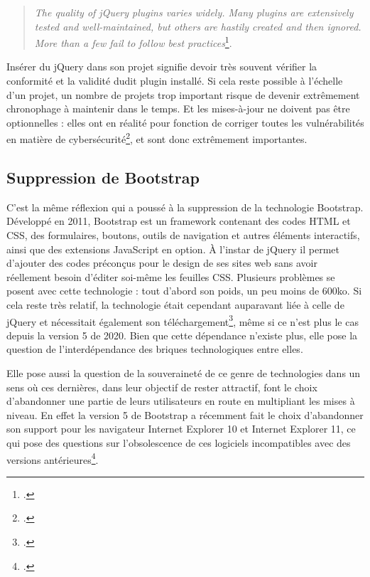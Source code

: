 \documentclass[a4paper,12pt,twoside]{book}
\begin{document}
\begin{otherlanguage}{english}
\begin{quote}
    \textit{The quality of jQuery plugins varies widely. Many plugins are extensively tested and well-maintained, but others are hastily created and then ignored. More than a few fail to follow best practices}\footcite{jquery}.
\end{quote}
\end{otherlanguage}

Insérer du jQuery dans son projet signifie devoir très souvent vérifier la conformité et la validité dudit plugin installé. Si cela reste possible à l'échelle d'un projet, un nombre de projets trop important risque de devenir extrêmement chronophage à maintenir dans le temps. Et les mises-à-jour ne doivent pas être optionnelles : elles ont en réalité pour fonction de corriger toutes les vulnérabilités en matière de cybersécurité\footcite{security}, et sont donc extrêmement importantes.

\subsection{Suppression de Bootstrap}
C'est la même réflexion qui a poussé à la suppression de la technologie Bootstrap. Développé en 2011, Bootstrap est un framework contenant des codes \acrshort{HTML} et CSS, des formulaires, boutons, outils de navigation et autres éléments interactifs, ainsi que des extensions JavaScript en option. À l'instar de jQuery il permet d'ajouter des codes préconçus pour le design de ses sites web sans avoir réellement besoin d'éditer soi-même les feuilles CSS. Plusieurs problèmes se posent avec cette technologie : tout d'abord son poids, un peu moins de 600ko. Si cela reste très relatif, la technologie était cependant auparavant liée à celle de jQuery et nécessitait également son téléchargement\footcite{why-bootstrap}, même si ce n'est plus le cas depuis la version 5 de 2020. Bien que cette dépendance n'existe plus, elle pose la question de l'interdépendance des briques technologiques entre elles.

Elle pose aussi la question de la souveraineté de ce genre de technologies dans un sens où ces dernières, dans leur objectif de rester attractif, font le choix d'abandonner une partie de leurs utilisateurs en route en multipliant les mises à niveau. En effet la version 5 de Bootstrap a récemment fait le choix d'abandonner son support pour les navigateur Internet Explorer 10 et Internet Explorer 11, ce qui pose des questions sur l'obsolescence de ces logiciels incompatibles avec des versions antérieures\footcite{themesberg_bootstrap}.
\end{document}
